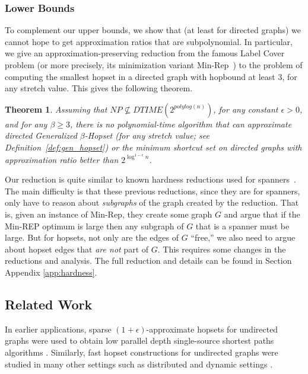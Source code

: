 \documentclass{article}
\newtheorem{theorem}{Theorem}[section]
\theoremstyle{definition}
\theoremstyle{remark}
\def\hopset {{\sc Generalized $\beta$-Hopset}}
\begin{document}
\subsubsection{Lower Bounds}

To complement our upper bounds, we show that (at least for directed graphs) we cannot hope to get approximation ratios that are subpolynomial.  In particular, we give an approximation-preserving reduction from the famous Label Cover problem (or more precisely, its minimization variant Min-Rep~\cite{Kor01}) to the problem of computing the smallest hopset in a directed graph with hopbound at least $3$, for any stretch value.  This gives the following theorem.

\begin{theorem} \label{thm:LB-main}
    Assuming that $NP \not\subseteq DTIME(2^{polylog(n)})$, for any constant $\epsilon > 0$, and for any $\beta \geq 3$, there is no polynomial-time algorithm that can approximate directed {\hopset} (for any stretch value; see Definition~\ref{def:gen_hopset}) or the minimum shortcut set on directed graphs with approximation ratio better than $2^{\log^{1-\epsilon} n}$.
\end{theorem}

Our reduction is quite similar to known hardness reductions used for spanners~\cite{Kor01,EP07,DKR16,CD16}.  The main difficulty is that these previous reductions, since they are for spanners, only have to reason about \emph{subgraphs} of the graph created by the reduction.  That is, given an instance of Min-Rep, they create some graph $G$ and argue that if the Min-REP optimum is large then any subgraph of $G$ that is a spanner must be large.  But for hopsets, not only are the edges of $G$ ``free,'' we also need to argue about hopset edges that \emph{are not} part of $G$.  This requires some changes in the reductions and analysis. The full reduction and details can be found in \iflong Section \else Appendix \fi \ref{app:hardness}.



\subsection{Related Work}\label{sec:related_work}

In earlier applications, sparse $(1+\epsilon)$-approximate hopsets for undirected graphs were used to obtain low parallel depth single-source shortest paths algorithms \cite{klein1997, cohen2000, miller2015, elkin2019RNC}. Similarly, fast hopset constructions for undirected graphs were studied in many other settings such as distributed \cite{elkin2019journal, elkin2017, censor2021, elkin2017, dinitz2019, DM24} and dynamic settings \cite{bernstein2011,henzinger2014, gutenberg2020, chechik2018, LN2022}.
\end{document}

